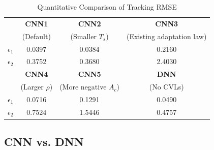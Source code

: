 \documentclass[letterpaper, 10 pt, conference]{ieeeconf}  %
\begin{document}


\begin{table}%
    \renewcommand{\arraystretch}{1.3}
    \caption{Quantitative Comparison of Tracking RMSE}
    \label{table: error norm}
    \centering
    \begin{tabular}{|c||c|c|c|}
    \hline
    & \bfseries CNN1 & \bfseries CNN2 & \bfseries CNN3 \\
    & (Default) & (Smaller $T_s$) & (Existing adaptation law) \\
    \hline 
    $\epsilon_1$ & 0.0397 & 0.0384 & 0.2160 \\
    \hline
    $\epsilon_2$ & 0.3752 & 0.3680 & 2.4030 \\
    \hline    
    & \bfseries CNN4 & \bfseries CNN5 & \bfseries DNN \\
    & (Larger $\rho$) & (More negative $A_c$) & (No CVLs) \\
    \hline 
    $\epsilon_1$ & 0.0716 & 0.1291 & 0.0490 \\
    \hline
    $\epsilon_2$ & 0.7524 & 1.5446 & 0.4757 \\
    \hline
    \end{tabular}
    \label{table: erro}
\end{table}

\subsection{CNN vs. DNN}
\end{document}
